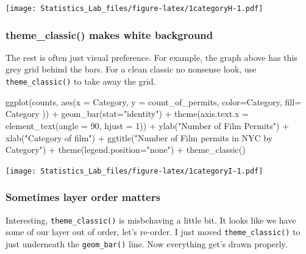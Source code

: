 \documentclass[
]{book}
\newenvironment{Shaded}{\begin{snugshade}}{\end{snugshade}}
\newcommand{\AttributeTok}[1]{\textcolor[rgb]{0.77,0.63,0.00}{#1}}
\newcommand{\DecValTok}[1]{\textcolor[rgb]{0.00,0.00,0.81}{#1}}
\newcommand{\FunctionTok}[1]{\textcolor[rgb]{0.00,0.00,0.00}{#1}}
\newcommand{\NormalTok}[1]{#1}
\newcommand{\SpecialCharTok}[1]{\textcolor[rgb]{0.00,0.00,0.00}{#1}}
\newcommand{\StringTok}[1]{\textcolor[rgb]{0.31,0.60,0.02}{#1}}
\begin{document}
\texttt{[image: Statistics\_Lab\_files/figure-latex/1categoryH-1.pdf]}

\hypertarget{theme_classic-makes-white-background}{%
\subsubsection{theme\_classic() makes white background}\label{theme_classic-makes-white-background}}

The rest is often just visual preference. For example, the graph above has this grey grid behind the bars. For a clean classic no nonsense look, use \texttt{theme\_classic()} to take away the grid.

\begin{Shaded}
\begin{Highlighting}[]
\FunctionTok{ggplot}\NormalTok{(counts, }\FunctionTok{aes}\NormalTok{(}\AttributeTok{x =}\NormalTok{ Category, }\AttributeTok{y =}\NormalTok{ count\_of\_permits, }
                   \AttributeTok{color=}\NormalTok{Category, }
                   \AttributeTok{fill=}\NormalTok{ Category )) }\SpecialCharTok{+}
  \FunctionTok{geom\_bar}\NormalTok{(}\AttributeTok{stat=}\StringTok{"identity"}\NormalTok{) }\SpecialCharTok{+} 
  \FunctionTok{theme}\NormalTok{(}\AttributeTok{axis.text.x =} \FunctionTok{element\_text}\NormalTok{(}\AttributeTok{angle =} \DecValTok{90}\NormalTok{, }\AttributeTok{hjust =} \DecValTok{1}\NormalTok{)) }\SpecialCharTok{+}
  \FunctionTok{ylab}\NormalTok{(}\StringTok{"Number of Film Permits"}\NormalTok{) }\SpecialCharTok{+} 
  \FunctionTok{xlab}\NormalTok{(}\StringTok{"Category of film"}\NormalTok{) }\SpecialCharTok{+}
  \FunctionTok{ggtitle}\NormalTok{(}\StringTok{"Number of Film permits in NYC by Category"}\NormalTok{) }\SpecialCharTok{+}
  \FunctionTok{theme}\NormalTok{(}\AttributeTok{legend.position=}\StringTok{"none"}\NormalTok{) }\SpecialCharTok{+}
  \FunctionTok{theme\_classic}\NormalTok{()}
\end{Highlighting}
\end{Shaded}

\texttt{[image: Statistics\_Lab\_files/figure-latex/1categoryI-1.pdf]}

\hypertarget{sometimes-layer-order-matters}{%
\subsubsection{Sometimes layer order matters}\label{sometimes-layer-order-matters}}

Interesting, \texttt{theme\_classic()} is misbehaving a little bit. It looks like we have some of our layer out of order, let's re-order. I just moved \texttt{theme\_classic()} to just underneath the \texttt{geom\_bar()} line. Now everything get's drawn properly.
\end{document}
